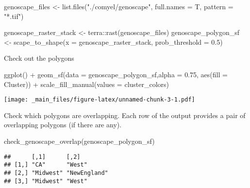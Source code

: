 \documentclass[
]{book}
\newenvironment{Shaded}{\begin{snugshade}}{\end{snugshade}}
\newcommand{\AttributeTok}[1]{\textcolor[rgb]{0.77,0.63,0.00}{#1}}
\newcommand{\FloatTok}[1]{\textcolor[rgb]{0.00,0.00,0.81}{#1}}
\newcommand{\FunctionTok}[1]{\textcolor[rgb]{0.00,0.00,0.00}{#1}}
\newcommand{\NormalTok}[1]{#1}
\newcommand{\OtherTok}[1]{\textcolor[rgb]{0.56,0.35,0.01}{#1}}
\newcommand{\SpecialCharTok}[1]{\textcolor[rgb]{0.00,0.00,0.00}{#1}}
\newcommand{\StringTok}[1]{\textcolor[rgb]{0.31,0.60,0.02}{#1}}
\begin{document}
\begin{Shaded}
\begin{Highlighting}[]
\NormalTok{genoscape\_files }\OtherTok{\textless{}{-}} \FunctionTok{list.files}\NormalTok{(}\StringTok{"./comyel/genoscape"}\NormalTok{, }
                                     \AttributeTok{full.names =}\NormalTok{ T,}
                                     \AttributeTok{pattern =} \StringTok{"*.tif"}\NormalTok{)}

\NormalTok{genoscape\_raster\_stack }\OtherTok{\textless{}{-}}\NormalTok{ terra}\SpecialCharTok{::}\FunctionTok{rast}\NormalTok{(genoscape\_files)}
\NormalTok{genoscape\_polygon\_sf }\OtherTok{\textless{}{-}} \FunctionTok{scape\_to\_shape}\NormalTok{(}\AttributeTok{x =}\NormalTok{ genoscape\_raster\_stack, }\AttributeTok{prob\_threshold =} \FloatTok{0.5}\NormalTok{)}
\end{Highlighting}
\end{Shaded}

Check out the polygons

\begin{Shaded}
\begin{Highlighting}[]
\FunctionTok{ggplot}\NormalTok{() }\SpecialCharTok{+}
  \FunctionTok{geom\_sf}\NormalTok{(}\AttributeTok{data =}\NormalTok{ genoscape\_polygon\_sf,}\AttributeTok{alpha =} \FloatTok{0.75}\NormalTok{, }\FunctionTok{aes}\NormalTok{(}\AttributeTok{fill =}\NormalTok{ Cluster)) }\SpecialCharTok{+}
  \FunctionTok{scale\_fill\_manual}\NormalTok{(}\AttributeTok{values =}\NormalTok{ cluster\_colors)}
\end{Highlighting}
\end{Shaded}

\texttt{[image: \_main\_files/figure-latex/unnamed-chunk-3-1.pdf]}

Check which polygons are overlapping. Each row of the output provides a pair of overlapping polygons (if there are any).

\begin{Shaded}
\begin{Highlighting}[]
\FunctionTok{check\_genoscape\_overlap}\NormalTok{(genoscape\_polygon\_sf)}
\end{Highlighting}
\end{Shaded}

\begin{verbatim}
##      [,1]      [,2]        
## [1,] "CA"      "West"      
## [2,] "Midwest" "NewEngland"
## [3,] "Midwest" "West"
\end{verbatim}
\end{document}
